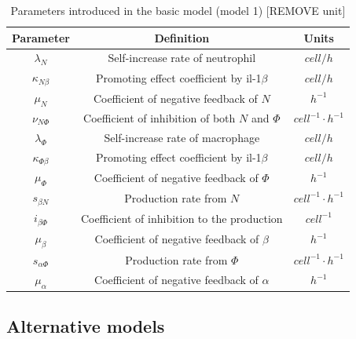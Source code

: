 \begin{table}[t]
    \centering
    \begin{tabular}{|c c c|}
        \hline
        Parameter            & Definition                                       & Units                    \\ [0.5ex]
        \hline\hline
        $\lambda_N$          & Self-increase rate of neutrophil                 & $cell/h$                 \\
        $\kappa_{N\beta}$    & Promoting effect coefficient by il-1$\beta$      & $cell/h$                 \\
        $\mu_N$              & Coefficient of negative feedback of $N$          & $h^{-1}$                 \\
        $\nu_{N\Phi}$        & Coefficient of inhibition of both $N$ and $\Phi$ & $cell^{-1}\cdotp h^{-1}$ \\
        \hline
        $\lambda_\Phi$       & Self-increase rate of macrophage                 & $cell/h$                 \\
        $\kappa_{\Phi\beta}$ & Promoting effect coefficient by il-1$\beta$      & $cell/h$                 \\
        $\mu_\Phi$           & Coefficient of negative feedback of $\Phi$       & $h^{-1}$                 \\
        \hline
        $s_{\beta N}$        & Production rate from $N$                         & $cell^{-1}\cdotp h^{-1}$ \\
        $i_{\beta\Phi}$      & Coefficient of inhibition to the production      & $cell^{-1}$              \\
        $\mu_\beta$          & Coefficient of negative feedback of $\beta$      & $h^{-1}$                 \\
        \hline
        $s_{\alpha\Phi}$     & Production rate from $\Phi$                      & $cell^{-1}\cdotp h^{-1}$ \\
        $\mu_\alpha$         & Coefficient of negative feedback of $\alpha$     & $h^{-1}$                 \\
        \hline
    \end{tabular}
    \caption{Parameters introduced in the basic model (model 1) [REMOVE unit]}
    \label{table:m1}
\end{table}

\subsection{Alternative models}

